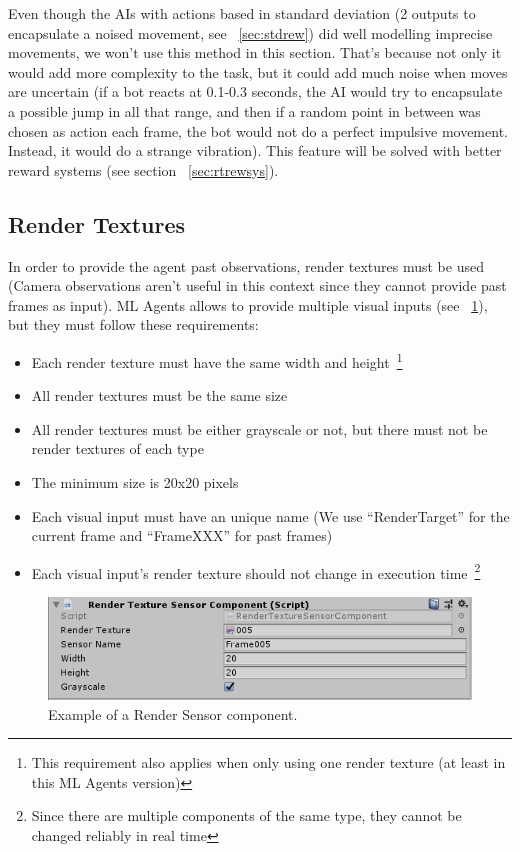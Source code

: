 Even though the AIs with actions based in standard deviation (2 outputs to encapsulate a noised movement, see ~\ref{sec:stdrew}) did well modelling imprecise movements, we won't use this method in this section. That's because not only it would add more complexity to the task, but it could add much noise when moves are uncertain (if a bot reacts at 0.1-0.3 seconds, the AI would try to encapsulate a possible jump in all that range, and then if a random point in between was chosen as action each frame, the bot would not do a perfect impulsive movement. Instead, it would do a strange vibration). This feature will be solved with better reward systems (see section ~\ref{sec:rtrewsys}).

\subsection{Render Textures}

In order to provide the agent past observations, render textures must be used (Camera observations aren't useful in this context since they cannot provide past frames as input). ML Agents allows to provide multiple visual inputs (see ~\ref{fig:rendersens}), but they must follow these requirements:

\begin{itemize}
 \item Each render texture must have the same width and height~\footnote{This requirement also applies when only using one render texture (at least in this ML Agents version)}
 \item All render textures must be the same size
 \item All render textures must be either grayscale or not, but there must not be render textures of each type
 \item The minimum size is 20x20 pixels
 \item Each visual input must have an unique name (We use ``RenderTarget'' for the current frame and ``FrameXXX'' for past frames)
 \item Each visual input's render texture should not change in execution time~\footnote{Since there are multiple components of the same type, they cannot be changed reliably in real time}
\end{itemize}

\begin{figure}[h]
  \centering
		\includegraphics[width=.6\textwidth]{img/rendersensor.png}
  \caption{Example of a Render Sensor component.}
  \label{fig:rendersens}
\end{figure}

